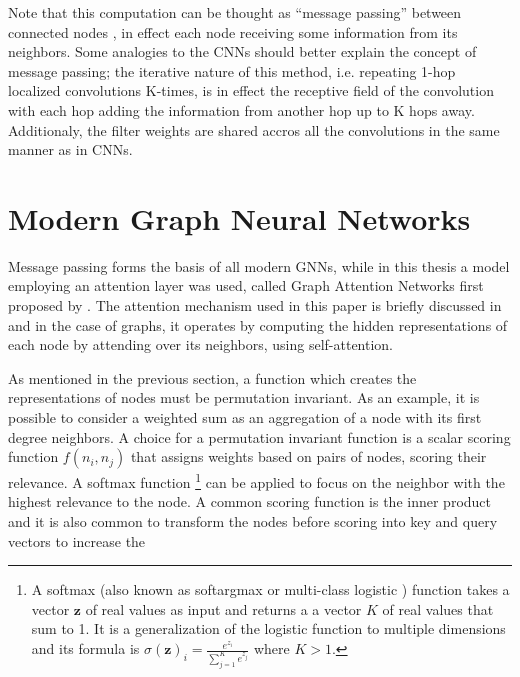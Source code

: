 Note that this computation can be thought as ``message passing'' between
connected nodes \cite{article:messageP}, in effect each node receiving some
information from its neighbors. Some analogies to the CNNs should better explain
the concept of message passing; the iterative nature of this method, i.e. repeating
1-hop localized convolutions K-times, is in effect the receptive field of the convolution
with each hop adding the information from another hop up to K hops away. Additionaly,
the filter weights are shared accros all the convolutions in the same manner as in
CNNs.


\section{Modern Graph Neural Networks}

Message passing forms the basis of all modern GNNs, while in this
thesis a model employing an attention layer was used, called Graph
Attention Networks first proposed by \citet{velickovic2017graph}.  The
attention \cite{article:attention} mechanism used in this paper is
briefly discussed in  and in the case of
graphs, it operates by computing the hidden representations of each
node by attending over its neighbors, using self-attention.



As mentioned in the previous section, a function which creates
the representations of nodes must be permutation invariant. As an
example, it is possible to consider a weighted sum as an aggregation
of a node with its first degree neighbors. A choice for a permutation
invariant function is a scalar scoring function $f(n_i, n_j)$ that
assigns weights based on pairs of nodes, scoring their relevance.
A softmax function \footnote{ A softmax (also known as softargmax or
  multi-class logistic ) function takes a vector $\bm{z}$ of real values
  as input and returns a a vector $K$ of real values that sum to 1. It
  is a generalization of the logistic function to multiple dimensions and
  its formula is $\sigma(\bm{z})_i = \frac{e^{z_i}}{\sum_{j=1}^K e^{z_j}}$
  where $K>1$.
} can be applied to focus on the neighbor with the highest relevance to the
node. A common scoring function is the inner product and it is also common
to transform the nodes before scoring into key and query vectors to increase
the 
